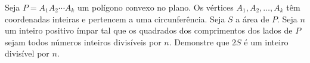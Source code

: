 Seja $P = A_1 A_2 \cdots A_k$ um polígono convexo no plano. Os vértices $A_1, A_2, \ldots, A_k$ têm coordenadas inteiras e pertencem a uma circunferência. Seja $S$ a área de $P$. Seja $n$ um inteiro positivo ímpar tal que os quadrados dos comprimentos dos lados de $P$ sejam todos números inteiros divisíveis por $n$. Demonstre que $2S$ é um inteiro divisível por $n$.
